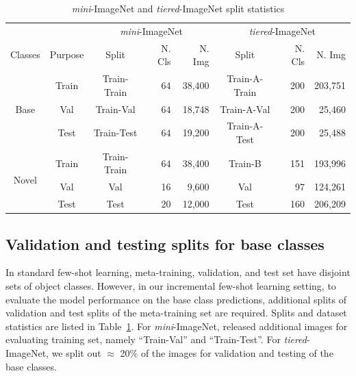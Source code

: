 \begin{table}[h]
\begin{small}
\caption{\textit{mini}-ImageNet and \textit{tiered}-ImageNet split statistics}
\vspace{-0.1in}
\label{tab:stats}
\begin{center}
\begin{tabular}{cc|crr|crr}
\toprule
&& \multicolumn{3}{c|}{\textit{mini}-ImageNet}& \multicolumn{3}{c}{\textit{tiered}-ImageNet} \\
Classes                & Purpose & Split         & N. Cls  & N. Img  & Split           & N. Cls   & N. Img \\
\midrule
\multirow{3}{*}{Base}  & Train   & Train-Train   & 64      & 38,400  & Train-A-Train   & 200      & 203,751   \\
                      & Val     & Train-Val     & 64      & 18,748  & Train-A-Val     & 200      & 25,460    \\
                      & Test    & Train-Test    & 64      & 19,200  & Train-A-Test    & 200      & 25,488    \\
\midrule
\multirow{3}{*}{Novel} & Train   & Train-Train   & 64      & 38,400  & Train-B         & 151      & 193,996   \\
                      & Val     & Val           & 16      & 9,600   & Val             & 97       & 124,261   \\
                      & Test    & Test          & 20      & 12,000  & Test            & 160      & 206,209   \\
\bottomrule
\end{tabular}
\end{center}
\end{small}
\vspace{-0.2in}
\end{table}

\subsection{Validation and testing splits for base classes}
In standard few-shot learning, meta-training, validation, and test set have disjoint sets of object
classes. However, in our incremental few-shot learning setting, to evaluate the model performance on
the base class predictions, additional splits of validation and test splits of the meta-training set
are required. Splits and dataset statistics are listed in Table~\ref{tab:stats}. For
\textit{mini}-ImageNet, \citet{lwof} released additional images for evaluating training set, namely
``Train-Val'' and ``Train-Test''. For \textit{tiered}-ImageNet, we split out $\approx$ 20\% of the
images for validation and testing of the base classes.

